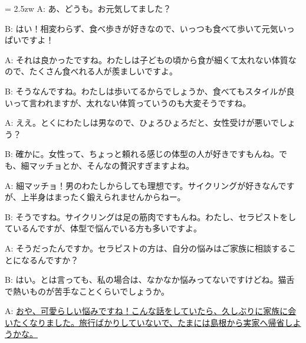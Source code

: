 \documentclass[11pt]{amsart}
\title{}
\author{}
\newenvironment{hangall}[1]{\hangindent = 2.5zw\everypar{\hangindent = 2.5zw}}{}
\begin{document}
\maketitle
\begin{hangall}{}%
A: あ、どうも。お元気してました？

B: はい！相変わらず、食べ歩きが好きなので、いっつも食べて歩いて元気いっぱいですよ！

A: それは良かったですね。わたしは子どもの頃から食が細くて太れない体質なので、たくさん食べれる人が羨ましいですよ。

B: そうなんですね。わたしは歩いてるからでしょうか、食べてもスタイルが良いって言われますが、太れない体質っていうのも大変そうですね。

A: ええ。とくにわたしは男なので、ひょろひょろだと、女性受けが悪いでしょう？

B: 確かに。女性って、ちょっと頼れる感じの体型の人が好きですもんね。でも、細マッチョとか、そんなの贅沢すぎますよね。

A: 細マッチョ！男のわたしからしても理想です。サイクリングが好きなんですが、上半身はまったく鍛えられませんからねー。

B: そうですね。サイクリングは足の筋肉ですもんね。わたし、セラピストをしているんですが、体型で悩んでいる方も多いですよ。

A: そうだったんですか。セラピストの方は、自分の悩みはご家族に相談することになるんですか？

B: はい。とは言っても、私の場合は、なかなか悩みってないですけどね。猫舌で熱いものが苦手なことくらいでしょうか。

A: \ul{おや、可愛らしい悩みですね！こんな話をしていたら、久しぶりに家族に会いたくなりました。旅行ばかりしていないで、たまには島根から実家へ帰省しようかな。}\end{hangall}
\end{document}
